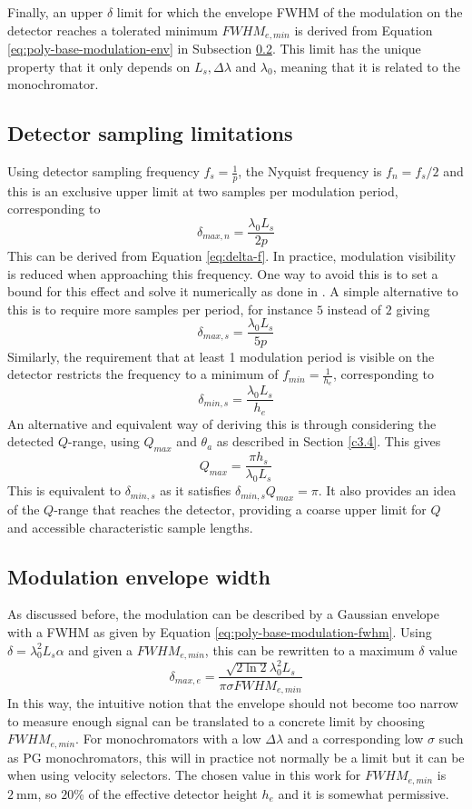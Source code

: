 Finally, an upper $\delta$ limit for which the envelope FWHM of the modulation on the detector reaches a tolerated minimum $FWHM_{e,min}$ is derived from Equation \eqref{eq:poly-base-modulation-env} in Subsection \ref{c4.1.3}. This limit has the unique property that it only depends on $L_s, \Delta\lambda$ and $\lambda_0$, meaning that it is related to the monochromator.

\subsection{Detector sampling limitations}
\label{c4.1.2}
Using detector sampling frequency $f_s = \frac{1}{p}$, the Nyquist frequency is $f_n = f_s/2$ and this is an exclusive upper limit at two samples per modulation period, corresponding to 
$$\delta_{max,n} = \frac{\lambda_0L_s}{2p}$$
This can be derived from Equation \eqref{eq:delta-f}. In practice, modulation visibility is reduced when approaching this frequency. One way to avoid this is to set a bound for this effect and solve it numerically as done in \cite{kusmin2017}. A simple alternative to this is to require more samples per period, for instance $5$ instead of $2$ giving
$$\delta_{max,s} = \frac{\lambda_0L_s}{5p}$$
Similarly, the requirement that at least 1 modulation period is visible on the detector restricts the frequency to a minimum of $f_{min} = \frac{1}{h_e}$, corresponding to 
$$\delta_{min,s} = \frac{\lambda_0L_s}{h_e}$$
An alternative and equivalent way of deriving this is through considering the detected $Q$-range, using $Q_{max}$ and $\theta_a$ as described in Section \ref{c3.4}. This gives 
$$Q_{max} = \frac{\pi h_s}{\lambda_0 L_s}$$
This is equivalent to $\delta_{min,s}$ as it satisfies $\delta_{min,s} Q_{max} = \pi$. It also provides an idea of the $Q$-range that reaches the detector, providing a coarse upper limit for $Q$ and accessible characteristic sample lengths. 

\subsection{Modulation envelope width}
\label{c4.1.3}
As discussed before, the modulation can be described by a Gaussian envelope with a FWHM as given by Equation \eqref{eq:poly-base-modulation-fwhm}. Using $\delta = \lambda_0^2L_s\alpha$ and given a $FWHM_{e,min}$, this can be rewritten to a maximum $\delta$ value
$$\delta_{max,e} = \frac{\sqrt{2\ln 2}\lambda_0^2 L_s}{\pi\sigma FWHM_{e,min}}$$
In this way, the intuitive notion that the envelope should not become too narrow to measure enough signal can be translated to a concrete limit by choosing $FWHM_{e,min}$. For monochromators with a low $\Delta\lambda$ and a corresponding low $\sigma$ such as PG monochromators, this will in practice not normally be a limit but it can be when using velocity selectors. The chosen value in this work for $FWHM_{e,min}$ is $\SI{2}{\milli\meter}$, so $20$\% of the effective detector height $h_e$ and it is somewhat permissive.  

